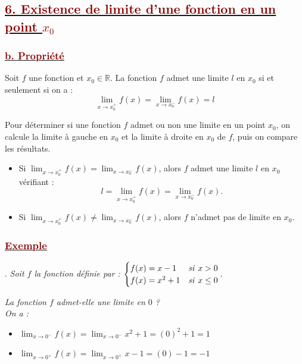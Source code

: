 \documentclass[12pt,a4paper]{article}
\begin{document}
\subsection*{\underline{\textcolor{darkred}{ 6. Existence de limite d’une fonction en un point $x_{0}$ }}}
\subsubsection*{\underline{\textcolor{darkred}{ b. Propriété }}}
Soit $f$ une fonction et $x_0 \in \mathbb{R}$. La fonction $f$ admet une limite $l$ en $x_0$ si et seulement si on a :
\[
\lim_{x \to x_0^+} f(x) = \lim_{x \to x_0^-} f(x) = l
\]

\vspace{0.3cm}

Pour déterminer si une fonction $f$ admet ou non une limite en un point $x_0$, on calcule la limite à gauche en $x_0$ et la limite à droite en $x_0$ de $f$, puis on compare les résultats.
\begin{itemize}
\item Si $\displaystyle \lim_{x \to x_0^+} f(x) = \lim_{x \to x_0^-} f(x)$, alors $f$ admet une limite $l$ en $x_0$ vérifiant :
\[
l = \lim_{x \to x_0^+} f(x) = \lim_{x \to x_0^-} f(x).
\]

\vspace{0.2cm}
\item Si $\displaystyle \lim_{x \to x_0^+} f(x) \neq \lim_{x \to x_0^-} f(x)$, alors $f$ n'admet pas de limite en $x_0$.
\end{itemize}

\subsubsection*{\underline{\textcolor{darkred}{ Exemple }}}  

. \textit{Soit $f$ la fonction définie par : } 
$\begin{cases} f(x) = x - 1 & \text{\textit{si }} x > 0 \\ f(x) = x^2 + 1 & \text{\textit{si }} x \leq 0 \end{cases}.$

\vspace{0.1cm}

\noindent \textit{La fonction $f$ admet-elle une limite en $0$ ?} \\
\textit{On a :}

\begin{itemize}
    \item $\displaystyle \lim_{x \to 0^-} f(x) = \lim_{x \to 0^-} x^2 + 1 = (0)^2 + 1 = 1$
    \vspace{0.2cm}
    \item $\displaystyle \lim_{x \to 0^+} f(x) = \lim_{x \to 0^+} x - 1 = (0) - 1 = -1$
\end{itemize}
\end{document}
